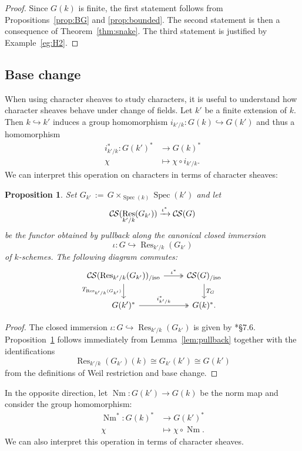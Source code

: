 \documentclass[10pt]{amsart}
\theoremstyle{plain}
\newtheorem{proposition}[theorem]{Proposition}
\theoremstyle{definition}
\newcommand{\Fq}{k}
\DeclareMathOperator{\Res}{Res}
\DeclareMathOperator{\Nm}{Nm}
\newcommand{\Spec}[1]{{\operatorname{Spec}(#1)}}
\newcommand{\ceq}{{\, :=\, }}
\newcommand{\TrFrob}[1]{T_{#1}}
\newcommand{\CS}{{\mathcal{C\hskip-0.8pt S}}}
\newcommand{\CSiso}[1]{\CS(#1)_{/\text{iso}}}
\begin{document}
\begin{proof}
Since $G(\Fq)$ is finite, the first statement follows from Propositions~\ref{prop:BG}
 and \ref{prop:bounded}. The second statement is then a consequence of Theorem~\ref{thm:snake}. 
 The third statement is justified by Example~\ref{eg:H2}.
 \end{proof}

\subsection{Base change}\label{ssec:basechange}

When using character sheaves to study characters, it is useful to understand
how character sheaves behave under change of fields.
Let $k'$ be a finite extension of $k$. Then $k \hookrightarrow k'$ induces a group homomorphism
$i_{k'/k} : G(k) \hookrightarrow G(k')$ and thus a homomorphism
\begin{align*}
i_{k'/k}^* : G(k')^* &\to G(k)^* \\
\chi &\mapsto \chi\circ i_{k'/k}.
\end{align*}
We can interpret this operation on characters in terms of character sheaves:

\begin{proposition} \label{prop:csbe}
Set $G_{k'} \ceq G\times_\Spec{k} \Spec{k'}$ and let
\[
\CS(\Res_{k'/k}(G_{k'})) \xrightarrow{\iota^*} \CS(G)
\]
be the functor obtained by pullback along the canonical closed immersion 
\[\iota : G \hookrightarrow \Res_{k'/k}(G_{k'})\] of $k$-schemes.
The following diagram commutes:
\[
\begin{tikzcd}
\CSiso{\Res_{k'/k}(G_{k'})} \arrow[two heads]{r}{\iota^*} \dar[swap]{\TrFrob{\Res_{k'/k}(G_{k'})}} & \CSiso{G} \dar{\TrFrob{G}} \\
G(k')^* \arrow[two heads]{r}{i_{k'/k}^*} & G(k)^*.
\end{tikzcd}
\]
\end{proposition}
\begin{proof}
The closed immersion $\iota : G \hookrightarrow \Res_{k'/k}(G_{k'})$ is given by \cite{bosch-lutkebohmert-reynaud:NeronModels}*{\S 7.6}.
Proposition~\ref{prop:csbe} follows immediately from Lemma~\ref{lem:pullback} together with the identifications
\[
\Res_{k'/k}(G_{k'})(k) \cong G_{k'}(k') \cong G(k')
\]
from the definitions of Weil restriction and base change.
\end{proof}

In the opposite direction, let $\Nm : G(k') \to G(k)$ be the norm map and consider the group homomorphism:
\begin{align*}
\Nm^* : G(k)^* &\to G(k')^* \\
\chi &\mapsto \chi\circ \Nm.
\end{align*}
We can also interpret this operation in terms of character sheaves.
\end{document}
